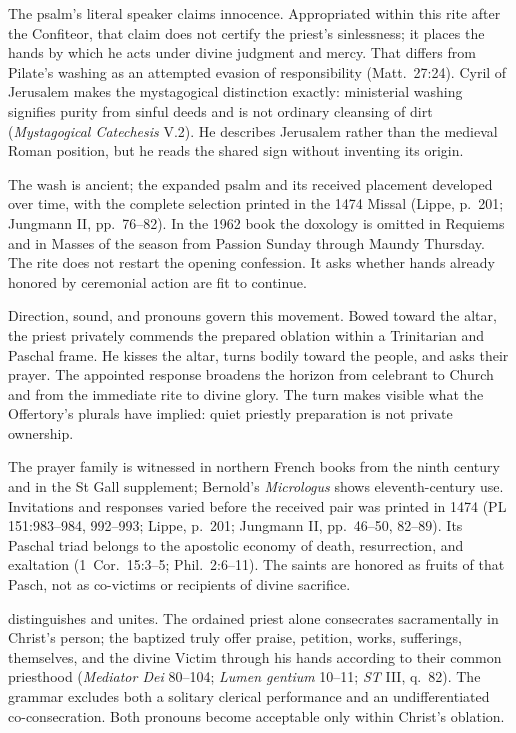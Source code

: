 The psalm's literal speaker claims innocence. Appropriated within this rite after the Confiteor, that claim does not certify the priest's sinlessness; it places the hands by which he acts under divine judgment and mercy. That differs from Pilate's washing as an attempted evasion of responsibility (Matt.~27:24). Cyril of Jerusalem makes the mystagogical distinction exactly: ministerial washing signifies purity from sinful deeds and is not ordinary cleansing of dirt (\emph{Mystagogical Catechesis} V.2). He describes Jerusalem rather than the medieval Roman position, but he reads the shared sign without inventing its origin.

The wash is ancient; the expanded psalm and its received placement developed over time, with the complete selection printed in the 1474 Missal (Lippe, p.~201; Jungmann II, pp.~76--82). In the 1962 book the doxology is omitted in Requiems and in Masses of the season from Passion Sunday through Maundy Thursday. The rite does not restart the opening confession. It asks whether hands already honored by ceremonial action are fit to continue.


Direction, sound, and pronouns govern this movement. Bowed toward the altar, the priest privately commends the prepared oblation within a Trinitarian and Paschal frame. He kisses the altar, turns bodily toward the people, and asks their prayer. The appointed response broadens the horizon from celebrant to Church and from the immediate rite to divine glory. The turn makes visible what the Offertory's plurals have implied: quiet priestly preparation is not private ownership.

The prayer family is witnessed in northern French books from the ninth century and in the St Gall supplement; Bernold's \emph{Micrologus} shows eleventh-century use. Invitations and responses varied before the received pair was printed in 1474 (PL 151:983--984, 992--993; Lippe, p.~201; Jungmann II, pp.~46--50, 82--89). Its Paschal triad belongs to the apostolic economy of death, resurrection, and exaltation (1~Cor.~15:3--5; Phil.~2:6--11). The saints are honored as fruits of that Pasch, not as co-victims or recipients of divine sacrifice.

 distinguishes and unites. The ordained priest alone consecrates sacramentally in Christ's person; the baptized truly offer praise, petition, works, sufferings, themselves, and the divine Victim through his hands according to their common priesthood (\emph{Mediator Dei} 80--104; \emph{Lumen gentium} 10--11; \emph{ST} III, q.~82). The grammar excludes both a solitary clerical performance and an undifferentiated co-consecration. Both pronouns become acceptable only within Christ's oblation.

